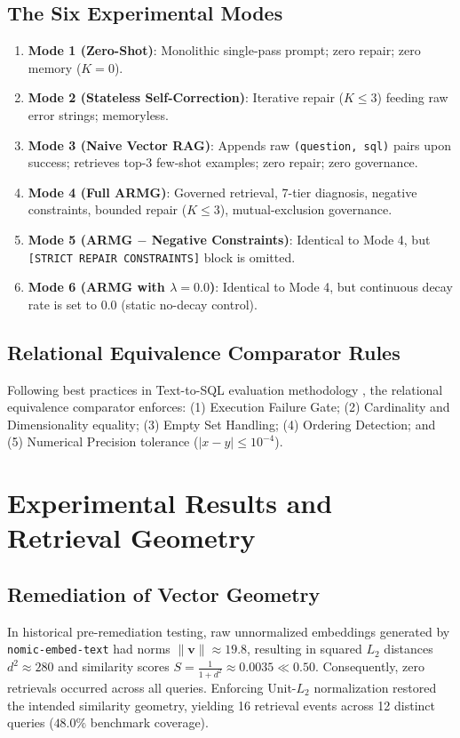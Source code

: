 \subsection{The Six Experimental Modes}
\begin{enumerate}
    \item \textbf{Mode 1 (Zero-Shot)}: Monolithic single-pass prompt; zero repair; zero memory ($K=0$).
    \item \textbf{Mode 2 (Stateless Self-Correction)}: Iterative repair ($K \le 3$) feeding raw error strings; memoryless.
    \item \textbf{Mode 3 (Naive Vector RAG)}: Appends raw \texttt{(question, sql)} pairs upon success; retrieves top-3 few-shot examples; zero repair; zero governance.
    \item \textbf{Mode 4 (Full ARMG)}: Governed retrieval, 7-tier diagnosis, negative constraints, bounded repair ($K \le 3$), mutual-exclusion governance.
    \item \textbf{Mode 5 (ARMG $-$ Negative Constraints)}: Identical to Mode 4, but \texttt{[STRICT\allowbreak{} REPAIR\allowbreak{} CONSTRAINTS]} block is omitted.
    \item \textbf{Mode 6 (ARMG with $\lambda = 0.0$)}: Identical to Mode 4, but continuous decay rate is set to 0.0 (static no-decay control).
\end{enumerate}

\subsection{Relational Equivalence Comparator Rules}
Following best practices in Text-to-SQL evaluation methodology \cite{finegandollak2018eval, zhong2020distilled}, the relational equivalence comparator enforces: (1) Execution Failure Gate; (2) Cardinality and Dimensionality equality; (3) Empty Set Handling; (4) Ordering Detection; and (5) Numerical Precision tolerance ($\vert{}x - y\vert{} \le 10^{-4}$).

\section{Experimental Results and Retrieval Geometry}

\subsection{Remediation of Vector Geometry}
In historical pre-remediation testing, raw unnormalized embeddings generated by \texttt{nomic-embed-text} had norms $\|\mathbf{v}\| \approx 19.8$, resulting in squared $L_2$ distances $d^2 \approx 280$ and similarity scores $S = \frac{1}{1 + d^2} \approx 0.0035 \ll 0.50$. Consequently, zero retrievals occurred across all queries. Enforcing Unit-$L_2$ normalization restored the intended similarity geometry, yielding 16 retrieval events across 12 distinct queries ($48.0\%$ benchmark coverage).

